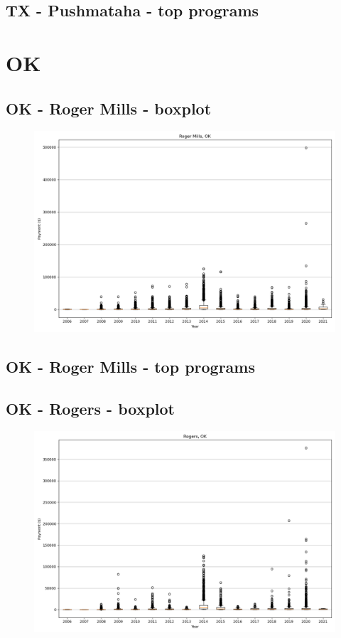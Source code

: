 \subsection*{TX - Pushmataha - top programs}

\newpage
\section*{OK}
\subsection*{OK - Roger Mills - boxplot}
\begin{figure}[h]
\centering
\includegraphics[width=7in]{../output/boxplots/counties/Roger Mills-OK_boxplot.png}
\end{figure}


\subsection*{OK - Roger Mills - top programs}

\newpage
\subsection*{OK - Rogers - boxplot}
\begin{figure}[h]
\centering
\includegraphics[width=7in]{../output/boxplots/counties/Rogers-OK_boxplot.png}
\end{figure}


